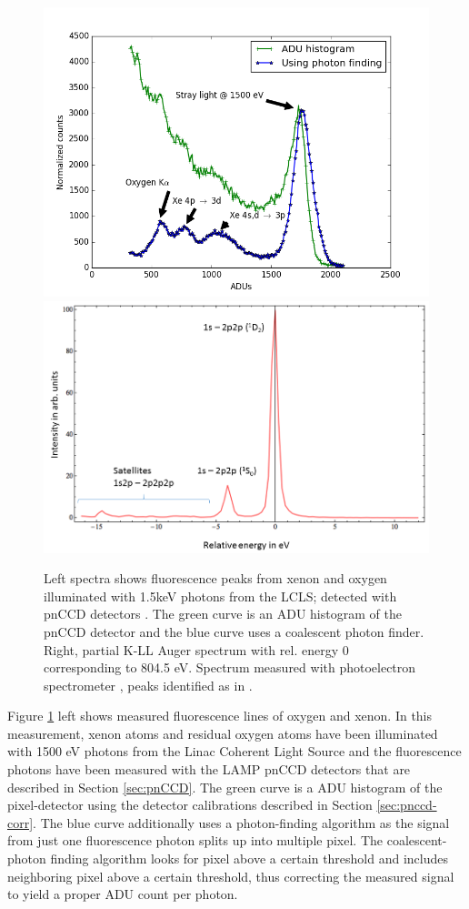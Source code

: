 \begin{figure}
	\centering
		\includegraphics[width=.49\textwidth]{images/pnCCD-histogram.png}
		\includegraphics[width=.49\textwidth]{images/auger-spectra.png}
	\caption[Fluorescence spectra from xenon and neon K-LL Auger spectrum.]{Left spectra shows fluorescence peaks from xenon and oxygen illuminated with 1.5keV photons from the LCLS; detected with pnCCD detectors \citep{Bucher-2016-Unpublished, Rudek-2012-NatPho}. The green curve is an ADU histogram of the pnCCD detector and the blue curve uses a coalescent photon finder. Right, partial K-LL Auger spectrum with rel. energy 0 corresponding to 804.5 eV. Spectrum measured with photoelectron spectrometer \cite{Bucher-2014-Unpublished}, peaks identified as in \citep{Krause-1970-PhysLettA}.}
	\label{fig:pnCCD-histogram}
\end{figure}
Figure \ref{fig:pnCCD-histogram} left shows measured fluorescence lines of oxygen and xenon. In this measurement, xenon atoms and residual oxygen atoms have been illuminated with 1500 eV photons from the Linac Coherent Light Source and the fluorescence photons have been measured with the LAMP pnCCD detectors that are described in Section \ref{sec:pnCCD}. The green curve is a ADU histogram of the pixel-detector using the detector calibrations described in Section \ref{sec:pnccd-corr}. The blue curve additionally uses a photon-finding algorithm as the signal from just one fluorescence photon splits up into multiple pixel. The coalescent-photon finding algorithm looks for pixel above a certain threshold and includes neighboring pixel above a certain threshold, thus correcting the measured signal to yield a proper ADU count per photon.\\
